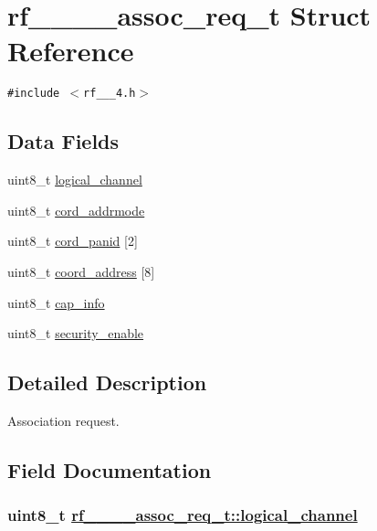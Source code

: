 \hypertarget{structrf__802__15__4__assoc__req__t}{
\section{rf\_\_\_\_\-assoc\_\-req\_\-t Struct Reference}
\label{structrf__802__15__4__assoc__req__t}
}
{\tt \#include $<$rf\_\_\_\-4.h$>$}

\subsection*{Data Fields}
\begin{CompactItemize}
\item 
uint8\_\-t \hyperlink{structrf__802__15__4__assoc__req__t_fcfe7e9969125cb656aaf65778e130a7}{logical\_\-channel}
\item 
uint8\_\-t \hyperlink{structrf__802__15__4__assoc__req__t_cfc3ef092d3cccf0b16fccfabfd73254}{cord\_\-addrmode}
\item 
uint8\_\-t \hyperlink{structrf__802__15__4__assoc__req__t_6ef014ac1fe8af11db0b0b73d8e6de99}{cord\_\-panid} \mbox{[}2\mbox{]}
\item 
uint8\_\-t \hyperlink{structrf__802__15__4__assoc__req__t_294ed6e2e6aa5baa4908f39f3dd26b9f}{coord\_\-address} \mbox{[}8\mbox{]}
\item 
uint8\_\-t \hyperlink{structrf__802__15__4__assoc__req__t_c3fa6e34dd008a9fd04ef877a3127e40}{cap\_\-info}
\item 
uint8\_\-t \hyperlink{structrf__802__15__4__assoc__req__t_271943aeb65f1e9b6f872e209c631416}{security\_\-enable}
\end{CompactItemize}


\subsection{Detailed Description}
Association request. 



\subsection{Field Documentation}
\hypertarget{structrf__802__15__4__assoc__req__t_fcfe7e9969125cb656aaf65778e130a7}{
\subsubsection[logical\_\-channel]{\setlength{\rightskip}{0pt plus 5cm}uint8\_\-t \hyperlink{structrf__802__15__4__assoc__req__t_fcfe7e9969125cb656aaf65778e130a7}{rf\_\_\_\_\-assoc\_\-req\_\-t::logical\_\-channel}}}
\label{structrf__802__15__4__assoc__req__t_fcfe7e9969125cb656aaf65778e130a7}


